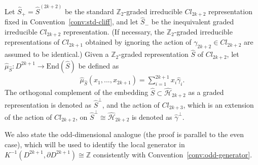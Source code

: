 \documentclass{amsart}
\theoremstyle{definition}
\theoremstyle{remark}
\begin{document}
Let $\hat{S}_{+}=\hat{S}^{(2k+2)}$ be the standard $\mathbb{Z}_2$-graded irreducible $Cl_{2k+2}$ representation fixed in Convention~\ref{conv:std-cliff}, and let $\hat{S}_{-}$ be the inequivalent graded irreducible $Cl_{2k+2}$ representation.
(If necessary, the $\mathbb{Z}_2$-graded irreducible representations of $Cl_{2k+1}$ obtained by ignoring the action of $\gamma_{2k+2}\in Cl_{2k+2}$ are assumed to be identical.)
Given a $\mathbb{Z}_2$-graded representation $\hat{S}$ of $Cl_{2k+2}$, let\,$\hat{\mu}_{\hat{S}}\colon D^{2k+1}\to \mathrm{End}(\hat{S})$ be defined as 
 \begin{align*} 
\hat{\mu}_{\hat{S}}(x_1,...,x_{2k+1})=\sum_{i=1}^{2k+1}x_{i}\hat{\gamma}_{i}.
\end{align*} 
The orthogonal complement of the embedding $\hat{S} \subset \mathcal{\hat{H}}_{2k+2}$ as a graded representation is denoted as $\hat{S}^{\perp}$, and the action of $Cl_{2k+3}$, which is an extension of the action of $Cl_{2k+2}$, on $\hat{S}^{\perp} \cong \mathcal{\hat{H}}_{2k+2}$ is denoted as $\hat{\gamma}^{\perp}$.

We also state the odd-dimensional analogue (the proof is parallel to the even case), which will be used
to identify the local generator in $K^{-1}(D^{2k+1},\partial D^{2k+1})\cong\mathbb Z$ consistently with
Convention~\ref{conv:odd-generator}.
                                                   
\end{document}
